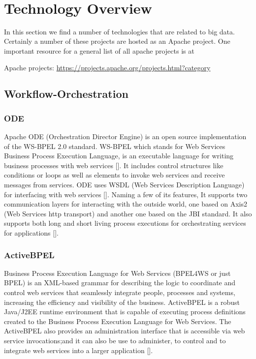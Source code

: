 \FILENAME\

\chapter{Technology Overview}


In this section we find a number of technologies that are related to
big data. Certainly a number of these projects are hosted as an Apache
project. One important resource for a general list of all apache
projects is at


Apache projects: \url{https://projects.apache.org/projects.html?category}


\section{Workflow-Orchestration}

\subsection{ODE}

Apache ODE (Orchestration Director Engine) is an open source
implementation of the WS-BPEL 2.0 standard. WS-BPEL which stands for
Web Services Business Process Execution Language, is an executable
language for writing business processes with web
services [\cite{www-bpel-wiki}].  It includes control structures like
conditions or loops as well as elements to invoke web services and
receive messages from services.  ODE uses WSDL (Web Services
Description Language) for interfacing with web
services [\cite{www-ode-wiki}]. Naming a few of its features, It
supports two communication layers for interacting with the outside
world, one based on Axis2 (Web Services http transport) and another
one based on the JBI standard. It also supports both long and short
living process executions for orchestrating services for
applications [\cite{www-ode-web}].

\subsection{ActiveBPEL}

Business Process Execution Language for Web Services (BPEL4WS or just
BPEL) is an XML-based grammar for describing the logic to coordinate
and control web services that seamlessly integrate people, processes
and systems, increasing the efficiency and visibility of the
business. ActiveBPEL is a robust Java/J2EE runtime environment that is
capable of executing process definitions created to the Business
Process Execution Language for Web Services. The ActiveBPEL also
provides an administration interface that is accessible via web
service invocations;and it can also be use to administer, to control
and to integrate web services into a larger
application [\cite{www-bpel}].


